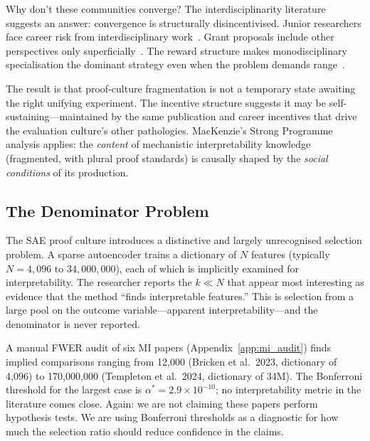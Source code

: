 \documentclass{article}
\begin{document}
Why don't these communities converge? The interdisciplinarity literature suggests an answer: convergence is structurally disincentivised. Junior researchers face career risk from interdisciplinary work~\citep{leahey_prominent_2017}. Grant proposals include other perspectives only superficially~\citep{klein_interdisciplinarity_2010}. The reward structure makes monodisciplinary specialisation the dominant strategy even when the problem demands range~\citep{epstein_range_2019}.

The result is that proof-culture fragmentation is not a temporary state awaiting the right unifying experiment. The incentive structure suggests it may be self-sustaining---maintained by the same publication and career incentives that drive the evaluation culture's other pathologies. MacKenzie's Strong Programme analysis applies: the \textit{content} of mechanistic interpretability knowledge (fragmented, with plural proof standards) is causally shaped by the \textit{social conditions} of its production.

\subsection{The Denominator Problem}
\label{sec:denominator}

The SAE proof culture introduces a distinctive and largely unrecognised selection problem. A sparse autoencoder trains a dictionary of $N$ features (typically $N = 4{,}096$ to $34{,}000{,}000$), each of which is implicitly examined for interpretability. The researcher reports the $k \ll N$ that appear most interesting as evidence that the method ``finds interpretable features.'' This is selection from a large pool on the outcome variable---apparent interpretability---and the denominator is never reported.

A manual FWER audit of six MI papers (Appendix~\ref{app:mi_audit}) finds implied comparisons ranging from 12,000 (Bricken et al.~2023, dictionary of 4,096) to 170,000,000 (Templeton et al.~2024, dictionary of 34M). The Bonferroni threshold for the largest case is $\alpha^* = 2.9 \times 10^{-10}$; no interpretability metric in the literature comes close. Again: we are not claiming these papers perform hypothesis tests. We are using Bonferroni thresholds as a diagnostic for how much the selection ratio should reduce confidence in the claims.
\end{document}
